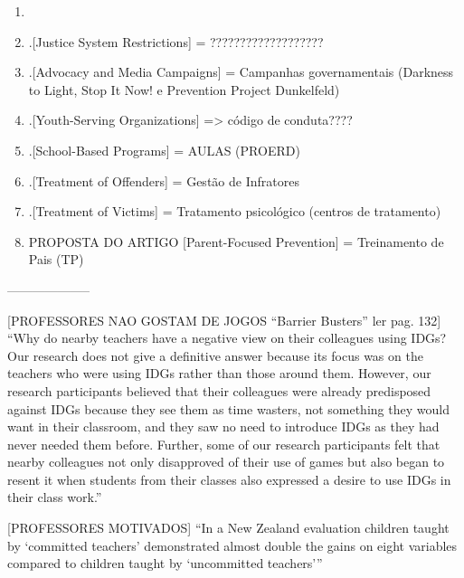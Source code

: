 \begin{enumerate}
  \item \cite{mendelson2015parent}

  \item .[Justice System Restrictions] = ???????????????????

  \item .[Advocacy and Media Campaigns] = Campanhas governamentais (Darkness to Light, Stop It Now! e Prevention Project Dunkelfeld)

  \item .[Youth-Serving Organizations] => código de conduta????

  \item .[School-Based Programs] = AULAS (PROERD)

  \item .[Treatment of Offenders] = Gestão de Infratores

  \item .[Treatment of Victims] = Tratamento psicológico (centros de tratamento)
  
  \item PROPOSTA DO ARTIGO [Parent-Focused Prevention] = Treinamento de Pais (TP)
\end{enumerate}



-------------------- 







[PROFESSORES NAO GOSTAM DE JOGOS “Barrier Busters” ler pag. 132]
``Why do nearby teachers have a negative view on their colleagues using IDGs? Our research does not give a definitive answer because its focus was on the teachers who were using IDGs rather than those around them. However, our research participants believed that their colleagues were already predisposed against IDGs because they see them as time wasters, not something they would want in their classroom, and they saw no need to introduce IDGs as they had never needed them before. Further, some of our research participants felt that nearby colleagues not only disapproved of their use of games but also began to resent it when students from their classes also expressed a desire to use IDGs in their class work.''\cite{dip2016advancing}

[PROFESSORES MOTIVADOS]
``In a New Zealand evaluation children taught by ‘committed teachers’ demonstrated almost double the gains on eight variables compared to children taught by ‘uncommitted teachers’'' \cite{dip2016advancing}

